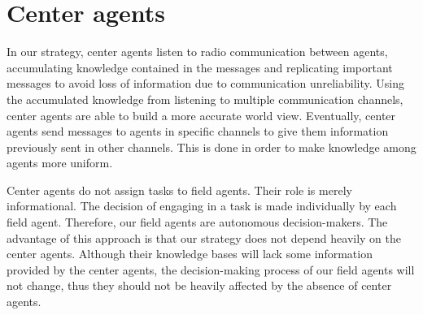 \section{Center agents}
\label{sec:center}
In our strategy, center agents listen to radio communication between agents, accumulating knowledge contained in the messages and replicating important messages to avoid loss of information due to communication unreliability. Using the accumulated knowledge from listening to multiple communication channels, center agents are able to build a more accurate world view. Eventually, center agents send messages to agents in specific channels to give them information previously sent in other channels. This is done in order to make knowledge among agents more uniform.

Center agents do not assign tasks to field agents. Their role is merely informational. The decision of engaging in a task is made individually by each field agent. Therefore, our field agents are autonomous decision-makers. The advantage of this approach is that our strategy does not depend heavily on the center agents. Although their knowledge bases will lack some information provided by the center agents, the decision-making process of our field agents will not change, thus they should not be heavily affected by the absence of center agents.

